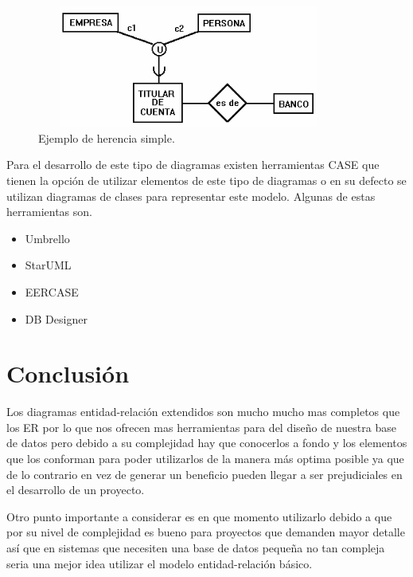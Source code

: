 \documentclass[12pt, titlepage]{article}
\begin{document}
    \begin{figure}[H]
        \begin{center}
            \includegraphics[width=10cm, height=4cm]{img/notacion5.png}
            \caption{Ejemplo de herencia simple.}
            \label{fig:ejemplo5}
        \end{center}
    \end{figure}
    
    Para el desarrollo de este tipo de diagramas existen herramientas CASE que tienen la opción de utilizar elementos de este tipo de diagramas o en su defecto se utilizan diagramas de clases para representar este modelo. Algunas de estas herramientas son.
    \begin{itemize}
        \item Umbrello
        \item StarUML
        \item EERCASE
        \item DB Designer
    \end{itemize}
    \section{Conclusión}
    Los diagramas entidad-relación extendidos son mucho mucho mas completos que los ER por lo que nos ofrecen mas herramientas para del diseño de nuestra base de datos pero debido a su complejidad hay que conocerlos a fondo y los elementos que los conforman para poder utilizarlos de la manera más optima posible ya que de lo contrario en vez de generar un beneficio pueden llegar a ser prejudiciales en el desarrollo de un proyecto. 
    
    Otro punto importante a considerar es en que momento utilizarlo debido a que por su nivel de complejidad es bueno para proyectos que demanden mayor detalle así que en sistemas que necesiten una base de datos pequeña no tan compleja seria una mejor idea utilizar el modelo entidad-relación básico.
     
    
\end{document}
